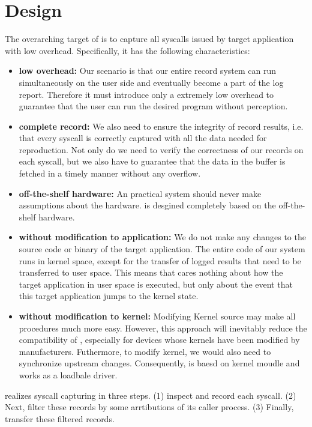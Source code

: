 \section{Design}
The overarching target of \TheName is to capture all syscalls issued by target application with low overhead. Specifically, it has the following characteristics:

\begin{itemize}
    \item \textbf{low overhead:} Our scenario is that our entire record system can  run simultaneously on the user side and eventually become a part of the log report. Therefore it must introduce only a extremely low overhead to guarantee that the user can run the desired program without perception.
    \item \textbf{complete record:} We also need to ensure the integrity of record results, i.e. that every syscall is correctly captured with all the data needed for reproduction. Not only do we need to verify the correctness of our records on each syscall, but we also have to guarantee that the data in the buffer is fetched in a timely manner without any overflow.
    \item \textbf{off-the-shelf hardware:} An practical system should never make assumptions about the hardware. \TheName is desgined completely based on the off-the-shelf hardware.
    \item \textbf{without modification to application:} We do not make any changes to the source code or binary of the target application. The entire code of our system runs in kernel space, except for the transfer of logged results that need to be transferred to user space. This means that \TheName cares nothing about how the target application in user space is executed, but only about the event that this target application jumps to the kernel state.
    \item \textbf{without modification to kernel:} Modifying Kernel source may make all procedures much more easy. However, this approach will inevitably reduce the compatibility of \TheName, especially for devices whose kernels have been modified by manufacturers. Futhermore, to modify kernel, we would also need to synchronize upstream changes. Consequently, \TheName is baesd on kernel moudle and works as a loadbale driver.
\end{itemize}


\TheName realizes syscall capturing in three steps. (1) \TheName inspect and record each syscall. (2) Next, \TheName filter these records by some arrtibutions of its caller process. (3) Finally, \TheName transfer these filtered records.

